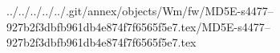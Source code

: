 ../../../../../.git/annex/objects/Wm/fw/MD5E-s4477--927b2f3dbfb961db4e874f7f6565f5e7.tex/MD5E-s4477--927b2f3dbfb961db4e874f7f6565f5e7.tex